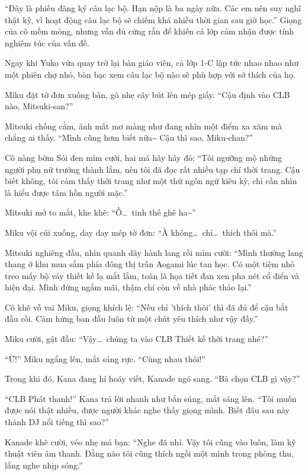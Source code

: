 \documentclass[../main.tex]{subfiles}
\begin{document}
``Đây là phiếu đăng ký câu lạc bộ. Hạn nộp là ba ngày nữa. Các em nên suy nghĩ thật kỹ, vì hoạt động câu lạc bộ sẽ chiếm khá nhiều thời gian sau giờ học.'' Giọng của cô mềm mỏng, nhưng vẫn đủ cứng rắn để khiến cả lớp cảm nhận được tính nghiêm túc của vấn đề.

Ngay khi Yuko vừa quay trở lại bàn giáo viên, cả lớp 1-C lập tức nhao nhao như một phiên chợ nhỏ, bàn bạc xem câu lạc bộ nào sẽ phù hợp với sở thích của họ.

Miku đặt tờ đơn xuống bàn, gõ nhẹ cây bút lên mép giấy. ``Cậu định vào CLB nào, Mitsuki-san?''

Mitsuki chống cằm, ánh mắt mơ màng như đang nhìn một điểm xa xăm mà chẳng ai thấy.
``Mình cũng hơm biết nữa\~{} Cậu thì sao, Miku-chan?''

Cô nàng bờm Sói đen mỉm cười, hai má hây hây đỏ: ``Tôi ngưỡng mộ những người phụ nữ trưởng thành lắm, nên tôi đã đọc rất nhiều tạp chí thời trang. Cậu biết không, tôi cảm thấy thời trang như một thứ ngôn ngữ kiêu kỳ, chỉ cần nhìn là hiểu được tâm hồn người mặc.''

Mitsuki mở to mắt, khe khẽ: ``Ồ\dots\ tinh thế ghê ha\~{}''

Miku vội cúi xuống, day day mép tờ đơn: ``À không\dots\ chỉ\dots\ thích thôi mà.''

Mitsuki nghiêng đầu, nhìn quanh dãy hành lang rồi mỉm cười: ``Mình thường lang thang ở khu mua sắm phía đông thị trấn Aogami lúc tan học. Có một tiệm nhỏ treo mấy bộ váy thiết kế lạ mắt lắm, toàn là họa tiết đan xen pha nét cổ điển và hiện đại. Mình đứng ngắm mãi, thậm chí còn về nhà phác thảo lại.''

Cô khẽ vỗ vai Miku, giọng khích lệ: ``Nếu chỉ 'thích thôi' thì đã đủ để cậu bắt đầu rồi. Cảm hứng ban đầu luôn từ một chút yêu thích như vậy đấy.''

Miku cười, gật đầu: ``Vậy\dots\ chúng ta vào CLB Thiết kế thời trang nhé?''

``Ừ!'' Miku ngẩng lên, mắt sáng rực. ``Cùng nhau thôi!''

Trong khi đó, Kana đang hí hoáy viết, Kanade ngó sang. ``Bà chọn CLB gì vậy?''

``CLB Phát thanh!'' Kana trả lời nhanh như bắn súng, mắt sáng lên. ``Tôi muốn được nói thật nhiều, được người khác nghe thấy giọng mình. Biết đâu sau này thành DJ nổi tiếng thì sao?''

Kanade khẽ cười, véo nhẹ má bạn: ``Nghe đã nhỉ. Vậy tôi cũng vào luôn, làm kỹ thuật viên âm thanh. Đằng nào tôi cũng thích ngồi một mình trong phòng thu, lắng nghe nhịp sóng.''
\end{document}
